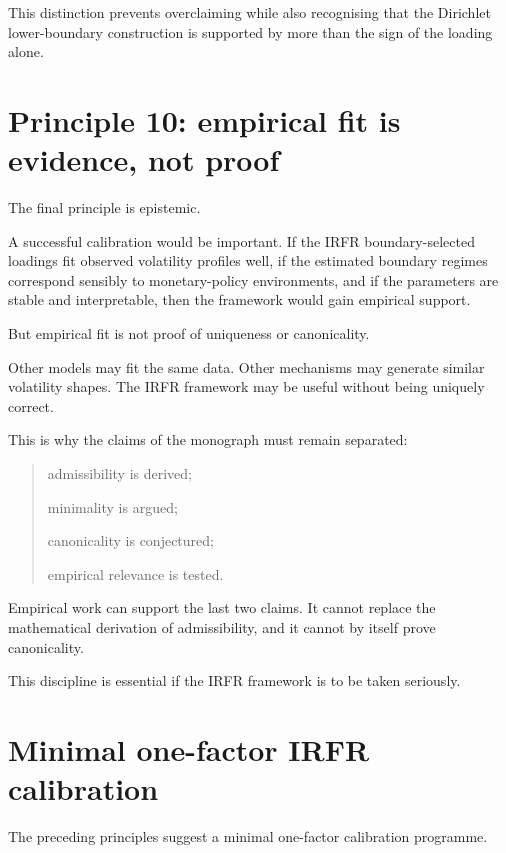 \documentclass[11pt,oneside]{book}
\begin{document}
This distinction prevents overclaiming while also recognising that the
Dirichlet lower-boundary construction is supported by more than the sign
of the loading alone.

\section{Principle 10: empirical fit is evidence, not
proof}\label{principle-10-empirical-fit-is-evidence-not-proof}

The final principle is epistemic.

A successful calibration would be important. If the IRFR
boundary-selected loadings fit observed volatility profiles well, if the
estimated boundary regimes correspond sensibly to monetary-policy
environments, and if the parameters are stable and interpretable, then
the framework would gain empirical support.

But empirical fit is not proof of uniqueness or canonicality.

Other models may fit the same data. Other mechanisms may generate
similar volatility shapes. The IRFR framework may be useful without
being uniquely correct.

This is why the claims of the monograph must remain separated:

\begin{quote}
\item  admissibility is derived;

\item  minimality is argued;

\item  canonicality is conjectured;

\item  empirical relevance is tested.
\end{quote}

Empirical work can support the last two claims. It cannot replace the
mathematical derivation of admissibility, and it cannot by itself prove
canonicality.

This discipline is essential if the IRFR framework is to be taken
seriously.

\section{Minimal one-factor IRFR
calibration}\label{minimal-one-factor-irfr-calibration}

The preceding principles suggest a minimal one-factor calibration
programme.
\end{document}
